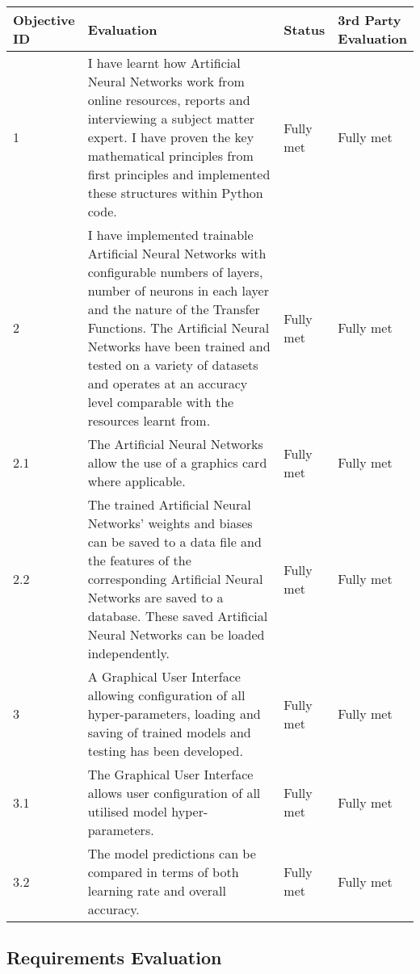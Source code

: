 \documentclass[./project-report/src/latex/project-report.tex]{subfiles}
\begin{document}
\begin{tabular}{|p{0.13\linewidth}|p{0.59\linewidth}|p{0.12\linewidth}|p{0.16\linewidth}|}
    \hline
    \textbf{Objective ID} & \textbf{Evaluation} & \textbf{Status} & \textbf{3rd Party Evaluation} \\
    \hline
    1 & I have learnt how Artificial Neural Networks work from online resources, reports and interviewing a subject matter expert. I have proven the key mathematical principles from first principles 
        and implemented these structures within Python code. & Fully met & Fully met \\
    \hline
    2 & I have implemented trainable Artificial Neural Networks with configurable numbers of layers, number of neurons in each layer and the nature of the Transfer Functions. The Artificial Neural 
        Networks have been trained and tested on a variety of datasets and operates at an accuracy level comparable with the resources learnt from. & Fully met & Fully met \\
    \hline
    2.1 & The Artificial Neural Networks allow the use of a graphics card where applicable. & Fully met & Fully met \\
    \hline
    2.2 & The trained Artificial Neural Networks' weights and biases can be saved to a data file and the features of the corresponding Artificial Neural Networks are saved to a database. These saved 
          Artificial Neural Networks can be loaded independently. & Fully met & Fully met \\
    \hline
    3 & A Graphical User Interface allowing configuration of all hyper-parameters, loading and saving of trained models and testing has been developed. & Fully met & Fully met \\
    \hline
    3.1 & The Graphical User Interface allows user configuration of all utilised model hyper-parameters. & Fully met & Fully met \\
    \hline
    3.2 & The model predictions can be compared in terms of both learning rate and overall accuracy. & Fully met & Fully met \\
    \hline
\end{tabular}

\subsection{Requirements Evaluation}
\end{document}
